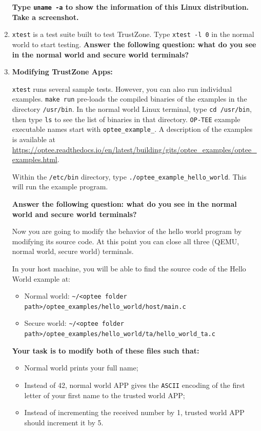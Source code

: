 \documentclass[10pt]{article}
\begin{document}
\begin{enumerate}
{\bf \color{red}Type \verb|uname -a| to show the information of this Linux distribution. Take a screenshot.}

\item \verb|xtest| is a test suite built to test TrustZone. Type \verb|xtest -l 0| in the normal world to start testing. 
{\bf \color{red}Answer the following question: what do you see in the normal world and secure world terminals?} 

\item {\bf Modifying TrustZone Apps:}

\verb|xtest| runs several sample tests. However, you can also run individual examples. \verb|make run| pre-loads the compiled binaries of the examples in the directory \verb|/usr/bin|. In the normal world Linux terminal, type \verb|cd /usr/bin|, then type \verb|ls| to see the list of binaries in that directory.
\verb|OP-TEE| example executable names start with \verb|optee_example_|. A description of the examples is available at \url{https://optee.readthedocs.io/en/latest/building/gits/optee_examples/optee_examples.html}.

Within the \verb|/etc/bin| directory, type \verb|./optee_example_hello_world|. This will run the example program.

{\bf \color{red}Answer the following question: what do you see in the normal world and secure world terminals?} 

Now you are going to modify the behavior of the hello world program by modifying its source code. At this point you can close all three (QEMU, normal world, secure world) terminals.

In your host machine, you will be able to find the source code of the Hello World example at:

\begin{itemize}
 \item Normal world: \verb|~/<optee folder path>/optee_examples/hello_world/host/main.c|
 \item Secure world: \verb|~/<optee folder path>/optee_examples/hello_world/ta/hello_world_ta.c|
\end{itemize}


\textbf{Your task is to modify both of these files such that:\\}

\begin{itemize}
 \item Normal world prints your full name;
 \item Instead of 42, normal world APP gives the \verb|ASCII| 
encoding of the first letter of your first name to the trusted world APP;
 \item Instead of incrementing the received number by 1, trusted world APP should increment it by 5.\\


\end{itemize}
\end{enumerate}
\end{document}
